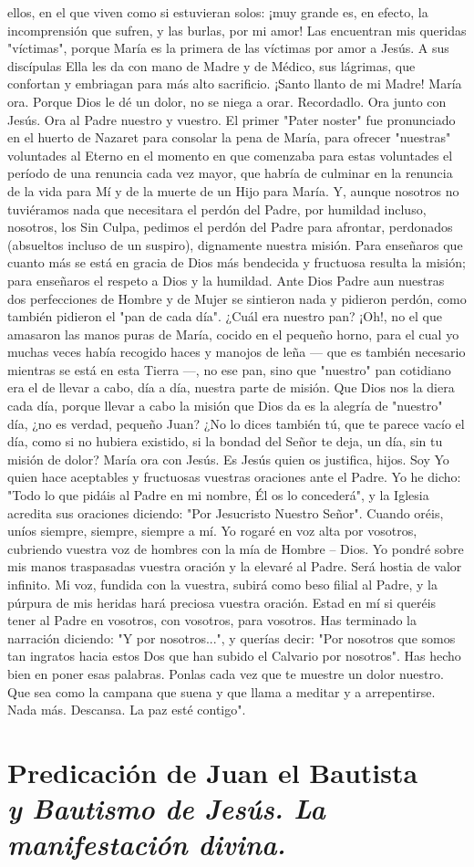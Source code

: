 \documentclass[12pt, twoside, openright]{book} %
\begin{document}
ellos, en el que viven como si estuvieran solos: ¡muy grande es, en efecto, la incomprensión que sufren, y las burlas, por mi amor! Las encuentran mis queridas "víctimas", porque María es la primera de las víctimas por amor a Jesús. A sus discípulas Ella les da con mano de Madre y de Médico, sus lágrimas, que confortan y embriagan para más alto sacrificio. ¡Santo llanto de mi Madre! María ora. Porque Dios le dé un dolor, no se niega a orar. Recordadlo. Ora junto con Jesús. Ora al Padre nuestro y vuestro. El primer "Pater noster" fue pronunciado en el huerto de Nazaret para consolar la pena de María, para ofrecer "nuestras" voluntades al Eterno en el momento en que comenzaba para estas voluntades el período de una renuncia cada vez mayor, que habría de culminar en la renuncia de la vida para Mí y de la muerte de un Hijo para María. Y, aunque nosotros no tuviéramos nada que necesitara el perdón del Padre, por humildad incluso, nosotros, los Sin Culpa, pedimos el perdón del Padre para afrontar, perdonados (absueltos incluso de un suspiro), dignamente nuestra misión. Para enseñaros que cuanto más se está en gracia de Dios más bendecida y fructuosa resulta la misión; para enseñaros el respeto a Dios y la humildad. Ante Dios Padre aun nuestras dos perfecciones de Hombre y de Mujer se sintieron nada y pidieron perdón, como también pidieron el "pan de cada día". ¿Cuál era nuestro pan? ¡Oh!, no el que amasaron las manos puras de María, cocido en el pequeño horno, para el cual yo muchas veces había recogido haces y manojos de leña — que es también necesario mientras se está en esta Tierra —, no ese pan, sino que "nuestro" pan cotidiano era el de llevar a cabo, día a día, nuestra parte de misión. Que Dios nos la diera cada día, porque llevar a cabo la misión que Dios da es la alegría de "nuestro" día, ¿no es verdad, pequeño Juan? ¿No lo dices también tú, que te parece vacío el día, como si no hubiera existido, si la bondad del Señor te deja, un día, sin tu misión de dolor? María ora con Jesús. Es Jesús quien os justifica, hijos. Soy Yo quien hace aceptables y fructuosas vuestras oraciones ante el Padre. Yo he dicho: "Todo lo que pidáis al Padre en mi nombre, Él os lo concederá", y la Iglesia acredita sus oraciones diciendo: "Por Jesucristo Nuestro Señor". Cuando oréis, uníos siempre, siempre, siempre a mí. Yo rogaré en voz alta por vosotros, cubriendo vuestra voz de hombres con la mía de Hombre – Dios. Yo pondré sobre mis manos traspasadas vuestra oración y la elevaré al Padre. Será hostia de valor infinito. Mi voz, fundida con la vuestra, subirá como beso filial al Padre, y la púrpura de mis heridas hará preciosa vuestra oración. Estad en mí si queréis tener al Padre en vosotros, con vosotros, para vosotros. Has terminado la narración diciendo: "Y por nosotros...", y querías decir: "Por nosotros que somos tan ingratos hacia estos Dos que han subido el Calvario por nosotros". Has hecho bien en poner esas palabras. Ponlas cada vez que te muestre un dolor nuestro. Que sea como la campana que suena y que llama a meditar y a arrepentirse. Nada más. Descansa. La paz esté contigo".

\chapter*{Predicación de Juan el Bautista \\ \normalfont\normalsize\textit{y Bautismo de Jesús. La manifestación divina.}}



\tableofcontents
\end{document}
